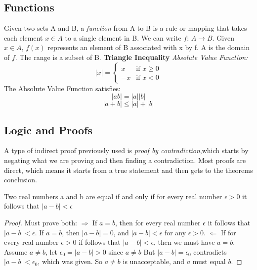     \subsection*{Functions}
        Given two sets A and B, a \textit{function}  from A to B is a rule or mapping that takes each element $x \in A$ to a single element in B. We can write $f$: $A \to B$. Given $x \in A$, $f(x)$ represents an element of B associated with x by f. A is the domain of $f$. The range is a subset of B.
        \newline
        \textbf{Triangle Inequality}
        \newline
        \indent \textit{Absolute Value Function: }
        \begin{equation*}
            |x| = \begin{cases}
                x & \text{if } x \geq 0 \\
                -x & \text{if } x < 0
            \end{cases}
        \end{equation*}
        \indent The Absolute Value Function satisfies:
        \begin{equation*}
            |ab| = |a||b|
        \end{equation*}
        \begin{equation*}
            |a + b| \leq |a| + |b|
        \end{equation*}
    \subsection*{Logic and Proofs}
        A type of indirect proof previously used is \textit{proof by contradiction},which starts by negating what we are proving and then finding a contradiction. Most proofs are direct, which means it starts from a true statement and then gets to the theorems conclusion.
        \begin{theorem}
            Two real numbers a and b are equal if and only if for every real number $\epsilon > 0$ it follows that $|a - b| < \epsilon$
        \end{theorem}
        \begin{proof}
            Must prove both:
            \newline
            $\Rightarrow$ If $a = b$, then for every real number $\epsilon$ it follows that $|a - b| < \epsilon$.
            \newline
            If $a = b$, then $|a - b| = 0$, and $|a - b| < \epsilon$ for any $\epsilon > 0$.
            \newline \newline
            $\Leftarrow$ If for every real number $\epsilon > 0$ if follows that $|a - b| < \epsilon$, then we must have $a = b$.
            \newline
            Assume $a \neq b$,
            \newline
            let $\epsilon_0 = |a - b| > 0$ since $a \neq b$
            \newline
            But $|a - b| = \epsilon_0$ contradicts $|a - b| < \epsilon_0$, which was given. So $a \neq b$ is unacceptable, and $a$ must equal $b$.
        \end{proof}
